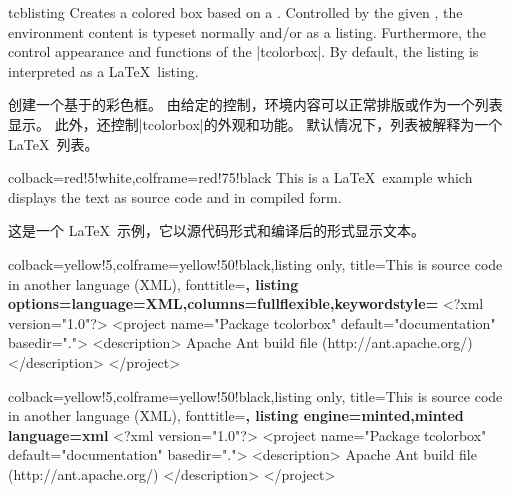 \begin{docEnvironment}{tcblisting}{}
Creates a colored box based on a .
Controlled by the given , the
environment content is typeset normally and/or as a listing.
Furthermore, the  control appearance and functions of
the |tcolorbox|.
By default, the listing is interpreted as a \LaTeX\ listing.

创建一个基于的彩色框。 由给定的控制，环境内容可以正常排版或作为一个列表显示。 此外，还控制|tcolorbox|的外观和功能。 默认情况下，列表被解释为一个\LaTeX\ 列表。
\begin{dispExample}
\begin{tcblisting}{colback=red!5!white,colframe=red!75!black}
This is a \LaTeX\ example which displays the text as source code
and in compiled form.

这是一个 \LaTeX\ 示例，它以源代码形式和编译后的形式显示文本。
\end{tcblisting}
\end{dispExample}


\begin{dispExample}
\begin{tcblisting}{colback=yellow!5,colframe=yellow!50!black,listing only,
title=This is source code in another language (XML), fonttitle=\bfseries,
listing options={language=XML,columns=fullflexible,keywordstyle=\color{red}}}
<?xml version="1.0"?>
<project name="Package tcolorbox" default="documentation" basedir=".">
<description>
Apache Ant build file (http://ant.apache.org/)
</description>
</project>
\end{tcblisting}
\end{dispExample}


\begin{dispExample}
\begin{tcblisting}{colback=yellow!5,colframe=yellow!50!black,listing only,
title=This is source code in another language (XML), fonttitle=\bfseries,
listing engine=minted,minted language=xml}
<?xml version="1.0"?>
<project name="Package tcolorbox" default="documentation" basedir=".">
<description>
Apache Ant build file (http://ant.apache.org/)
</description>
</project>
\end{tcblisting}
\end{dispExample}




\end{docEnvironment}

